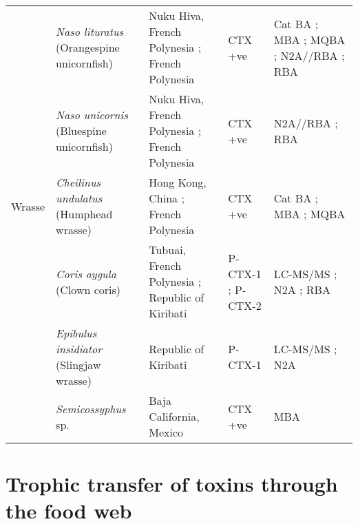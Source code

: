 \documentclass[12pt]{article}
\begin{document}
\begin{longtable}[l]{ | p{2cm} | p{3cm} | p{4.5cm} | p{2cm} | p{3cm} | }
	& \emph{Naso lituratus} (Orangespine unicornfish) & Nuku Hiva, French Polynesia \cite{darius2007ciguatera}; French Polynesia \cite{chinain2014mail,bagnis1987use} & CTX +ve \cite{darius2007ciguatera,bagnis1987use,chinain2014mail} & Cat BA \cite{bagnis1987use}; MBA \cite{bagnis1987use}; MQBA \cite{bagnis1987use}; N2A//RBA \cite{chinain2014mail}; RBA \cite{darius2007ciguatera}\\
	& \emph{Naso unicornis} (Bluespine unicornfish) & Nuku Hiva, French Polynesia \cite{darius2007ciguatera}; French Polynesia \cite{chinain2014mail} & CTX +ve \cite{darius2007ciguatera,chinain2014mail} & N2A//RBA \cite{chinain2014mail}; RBA \cite{darius2007ciguatera} \\
	\hline
	Wrasse & \emph{Cheilinus undulatus} (Humphead wrasse) & Hong Kong, China \cite{wong2005study,wong2009solid}; French Polynesia \cite{bagnis1987use} & CTX +ve \cite{bagnis1987use,wong2005study,wong2009solid} & Cat BA \cite{bagnis1987use}; MBA \cite{bagnis1987use,wong2005study,wong2009solid}; MQBA \cite{bagnis1987use} \\
	& \emph{Coris aygula} (Clown coris) & Tubuai, French Polynesia \cite{darius2007ciguatera}; Republic of Kiribati \cite{mak2013pacific} & P-CTX-1 \cite{mak2013pacific}; P-CTX-2 \cite{mak2013pacific} & LC-MS/MS \cite{mak2013pacific}; N2A \cite{mak2013pacific}; RBA \cite{darius2007ciguatera} \\
	& \emph{Epibulus insidiator} (Slingjaw wrasse) & Republic of Kiribati \cite{mak2013pacific} & P-CTX-1 \cite{mak2013pacific} & LC-MS/MS \cite{mak2013pacific}; N2A \cite{mak2013pacific} \\
	& \emph{Semicossyphus} sp. & Baja California, Mexico \cite{lechuga1995documented} & CTX +ve \cite{lechuga1995documented} & MBA \cite{lechuga1995documented}\\
	\hline
\end{longtable}


\FloatBarrier


\section{Trophic transfer of toxins through the food web}
\end{document}
